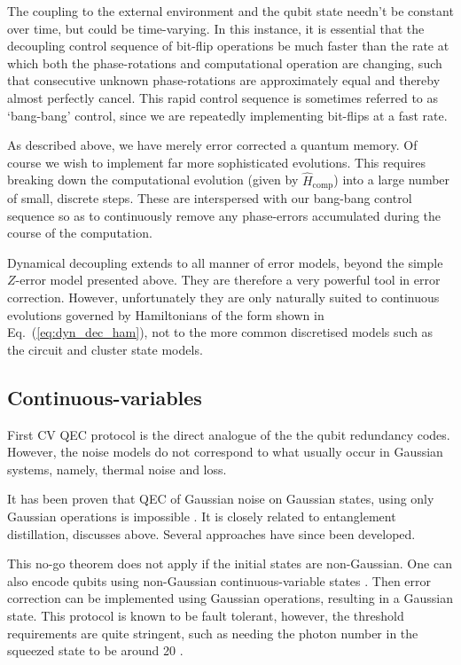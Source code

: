 The coupling to the external environment and the qubit state needn't be constant over time, but could be time-varying. In this instance, it is essential that the decoupling control sequence of bit-flip operations be much faster than the rate at which both the phase-rotations and computational operation are changing, such that consecutive unknown phase-rotations are approximately equal and thereby almost perfectly cancel. This rapid control sequence is sometimes referred to as `bang-bang' control, since we are repeatedly implementing bit-flips at a fast rate. 

As described above, we have merely error corrected a quantum memory. Of course we wish to implement far more sophisticated evolutions. This requires breaking down the computational evolution (given by $\hat{H}_\mathrm{comp}$) into a large number of small, discrete steps. These are interspersed with our bang-bang control sequence so as to continuously remove any phase-errors accumulated during the course of the computation.

Dynamical decoupling extends to all manner of error models, beyond the simple $Z$-error model presented above. They are therefore a very powerful tool in error correction. However, unfortunately they are only naturally suited to continuous evolutions governed by Hamiltonians of the form shown in Eq.~(\ref{eq:dyn_dec_ham}), not to the more common discretised models such as the circuit and cluster state models.


%
%

\subsection{Continuous-variables}

First CV QEC protocol is the direct analogue of the the qubit redundancy codes. However, the noise models do not correspond to what usually occur in Gaussian systems, namely, thermal noise and loss.

It has been proven that QEC of Gaussian noise on Gaussian states, using only Gaussian operations is impossible \cite{bib:PhysRevLett.102.120501}. It is closely related to entanglement distillation, discusses above. Several approaches have since been developed. 

This no-go theorem does not apply if the initial states are non-Gaussian. One can also encode qubits using non-Gaussian continuous-variable states \cite{bib:PhysRevA.64.012310}. Then error correction can be implemented using Gaussian operations, resulting in a Gaussian state. This protocol is known to be fault tolerant, however, the threshold requirements are quite stringent, such as needing the photon number in the squeezed state to be around 20 \cite{bib:PhysRevA.73.012325}.


